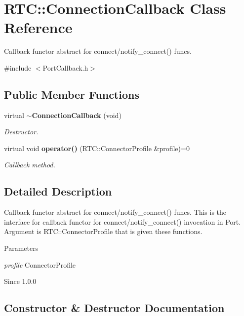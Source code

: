 \section{RTC::ConnectionCallback Class Reference}
\label{classRTC_1_1ConnectionCallback}


Callback functor abstract for connect/notify\_\-connect() funcs.  




{\ttfamily \#include $<$PortCallback.h$>$}

\subsection*{Public Member Functions}
\begin{DoxyCompactItemize}
\item 
virtual {\bf $\sim$ConnectionCallback} (void)
\begin{DoxyCompactList}\small\item\em Destructor. \item\end{DoxyCompactList}\item 
virtual void {\bf operator()} (RTC::ConnectorProfile \&profile)=0
\begin{DoxyCompactList}\small\item\em Callback method. \item\end{DoxyCompactList}\end{DoxyCompactItemize}


\subsection{Detailed Description}
Callback functor abstract for connect/notify\_\-connect() funcs. This is the interface for callback functor for connect/notify\_\-connect() invocation in Port. Argument is RTC::ConnectorProfile that is given these functions.


\begin{DoxyParams}{Parameters}
\item[{\em profile}]ConnectorProfile\end{DoxyParams}
\begin{DoxySince}{Since}
1.0.0 
\end{DoxySince}


\subsection{Constructor \& Destructor Documentation}
